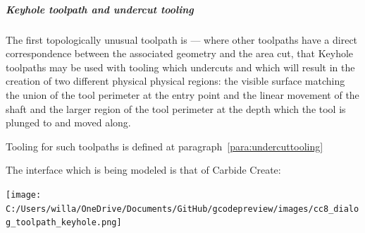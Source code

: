 \documentclass{ltxdoc}
\begin{document}
%
%
%
%
%

\subparagraph{Keyhole toolpath and undercut tooling}
 
\label{subsec:keyholetoolpaths}
The first topologically unusual toolpath is  --- where other toolpaths have a direct correspondence between the associated geometry and the area cut, that Keyhole toolpaths may be used with tooling which undercuts and which will result in the creation of two different physical physical regions: the visible surface matching the union of the tool perimeter at the entry point and the linear movement of the shaft and the larger region of the tool perimeter at the depth which the tool is plunged to and moved along.
 
Tooling for such toolpaths is defined at paragraph~\ref{para:undercuttooling}

The interface which is being modeled is that of Carbide Create:

\bigskip

\begin{centering}
\texttt{[image: C:/Users/willa/OneDrive/Documents/GitHub/gcodepreview/images/cc8\_dialog\_toolpath\_keyhole.png]}\par
\end{centering}
\end{document}

